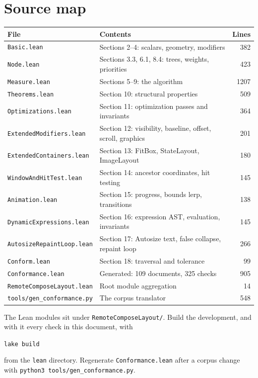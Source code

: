 \documentclass[11pt,a4paper]{article}
\newcommand{\file}[1]{\texttt{#1}}
\theoremstyle{definition}
\theoremstyle{plain}
\theoremstyle{remark}
\begin{document}
\section{Source map}

\begin{center}
\small
\begin{tabular}{@{}llr@{}}
\toprule
\textbf{File} & \textbf{Contents} & \textbf{Lines} \\
\midrule
\file{Basic.lean} & Sections 2--4: scalars, geometry, modifiers & 382 \\
\file{Node.lean} & Sections 3.3, 6.1, 8.4: trees, weights, priorities & 423 \\
\file{Measure.lean} & Sections 5--9: the algorithm & 1207 \\
\file{Theorems.lean} & Section 10: structural properties & 509 \\
\file{Optimizations.lean} & Section 11: optimization passes and invariants & 364 \\
\file{ExtendedModifiers.lean} & Section 12: visibility, baseline, offset, scroll, graphics & 201 \\
\file{ExtendedContainers.lean} & Section 13: FitBox, StateLayout, ImageLayout & 180 \\
\file{WindowAndHitTest.lean} & Section 14: ancestor coordinates, hit testing & 145 \\
\file{Animation.lean} & Section 15: progress, bounds lerp, transitions & 138 \\
\file{DynamicExpressions.lean} & Section 16: expression AST, evaluation, invariants & 145 \\
\file{AutosizeRepaintLoop.lean} & Section 17: Autosize text, false collapse, repaint loop & 266 \\
\file{Conform.lean} & Section 18: traversal and tolerance & 99 \\
\file{Conformance.lean} & Generated: 109 documents, 325 checks & 905 \\
\file{RemoteComposeLayout.lean} & Root module aggregation & 14 \\
\file{tools/gen\_conformance.py} & The corpus translator & 548 \\
\bottomrule
\end{tabular}
\end{center}

\noindent
The Lean modules sit under \file{RemoteComposeLayout/}. Build the development, and with it every check in this document, with
\begin{center}
\file{lake build}
\end{center}
from the \file{lean} directory. Regenerate \file{Conformance.lean} after a
corpus change with \file{python3 tools/gen\_conformance.py}.
\end{document}

